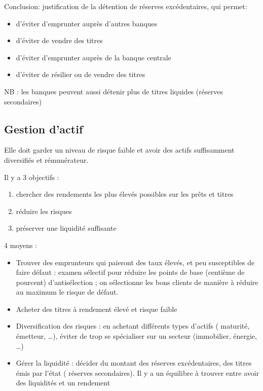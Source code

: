 	Conclusion: justification de la détention de 
réserves excédentaires, qui permet: 
	\begin{itemize}
		\item d'éviter d'emprunter auprès d'autres banques 
		\item d'éviter de vendre des titres 
		\item d'éviter d'emprunter auprès de la banque centrale 
		\item d'éviter de résilier ou de vendre des titres 
	\end{itemize}
	
	NB : les banques peuvent aussi détenir plus de titres liquides (réserves secondaires) 
	
	\subsection{Gestion d'actif}
	
	Elle doit garder un niveau de risque faible et avoir des actifs suffisamment diversifiés et rémunérateur.
	
	Il y a 3 objectifs :
	
	\begin{enumerate}
		\item chercher des rendements les plus élevés possibles sur les prêts et titres 
		\item réduire les risques 
		\item préserver une liquidité suffisante
	\end{enumerate}
	
	4 moyens :
	
	\begin{itemize}
		\item Trouver des emprunteurs qui paieront des taux élevés, et peu susceptibles de faire défaut : examen sélectif pour réduire les points de base (centième de pourcent) d'antisélection ; on sélectionne les bons clients de manière à réduire au maximum le risque de défaut.
		\item Acheter des titres à rendement élevé et risque faible
		\item Diversification des risques : en achetant différents types d'actifs ( maturité, émetteur, \dots), éviter de trop se spécialiser sur un secteur (immobilier, énergie, \dots) 
		\item Gérer la liquidité : décider du montant des réserves excédentaires, des titres émis par l'état ( réserves secondaires). Il y a un équilibre à trouver entre avoir des liquidités et un rendement
	\end{itemize}
	
